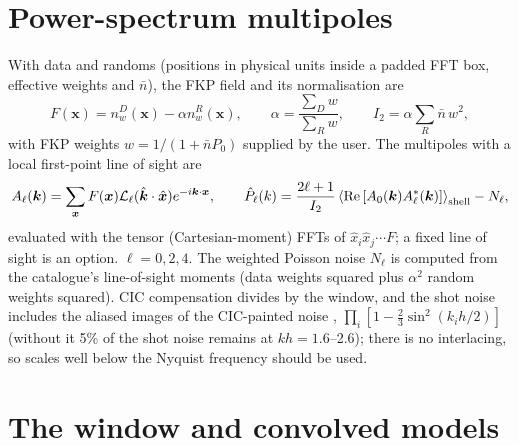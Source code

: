 \section{Power-spectrum multipoles}\label{sec:survey-power}

With data and randoms (positions in physical units inside a padded FFT box, effective weights and $\bar n$), the FKP field \cite{Feldman1994} and
its normalisation are
\begin{equation}
F(\bm x)=n_w^D(\bm x)-\alpha n_w^R(\bm x),\qquad\alpha=\frac{\sum_Dw}{\sum_Rw},\qquad I_2=\alpha\sum_R\bar n\,w^2,
\end{equation}
with FKP weights $w=1/(1+\bar nP_0)$ supplied by the user. The multipoles with a local first-point line of sight \cite{Yamamoto2006,Bianchi2015,
Scoccimarro2015} are
\begin{equation}
A_\ell(\bm k)=\sum_{\bm x}F(\bm x)\mathcal L_\ell(\hat{\bm k}\cdot\hat{\bm x})e^{-i\bm k\cdot\bm x},\qquad
\hat P_\ell(k)=\frac{2\ell+1}{I_2}\left\langle{\rm Re}\left[A_0(\bm k)A_\ell^*(\bm k)\right]\right\rangle_{\rm shell}-N_\ell,
\end{equation}
evaluated with the tensor (Cartesian-moment) FFTs of $\hat x_i\hat x_j\cdots F$; a fixed line of sight is an option. $\ell=0,2,4$. The weighted Poisson
noise $N_\ell$ is computed from the catalogue's line-of-sight moments (data weights squared plus $\alpha^2$ random weights squared). CIC compensation
divides by the window, and the shot noise includes the aliased images of the CIC-painted noise \cite{Jing2005}, $\prod_i[1-\frac23\sin^2(k_ih/2)]$
(without it 5\% of the shot noise remains at $kh=1.6$--2.6); there is no interlacing, so scales well below the Nyquist frequency should be used.

\section{The window and convolved models}\label{sec:survey-window}


